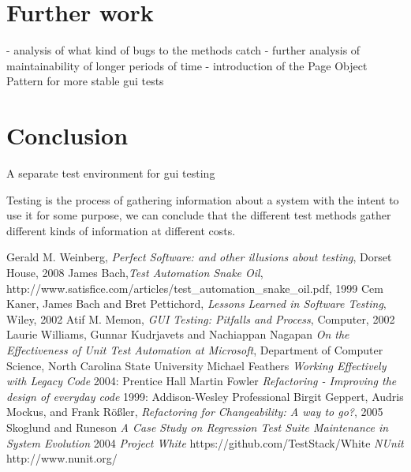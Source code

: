 \documentclass{article}
\begin{document}
	\section{Further work}
	- analysis of what kind of bugs to the methods catch
	- further analysis of maintainability of longer periods of time 
	- introduction of the Page Object Pattern for more stable gui tests

	\section{Conclusion}
		A separate test environment for gui testing

		Testing is the process of gathering information about a system with the intent to use it for some purpose, we can conclude that the different test methods gather different kinds of information at different costs.

\begin{thebibliography}{1}
 Gerald M. Weinberg, {\em Perfect Software: and other illusions about testing}, Dorset House, 2008
 James Bach,{\em Test Automation Snake Oil}, http://www.satisfice.com/articles/test\_automation\_snake\_oil.pdf, 1999 
 Cem Kaner, James Bach and Bret Pettichord, {\em Lessons Learned in Software Testing}, Wiley, 2002
 Atif M. Memon, {\em GUI Testing: Pitfalls and Process}, Computer, 2002
 Laurie Williams, Gunnar Kudrjavets and Nachiappan Nagapan {\em On the Effectiveness of Unit Test Automation at Microsoft}, Department of Computer Science, North Carolina State University
 Michael Feathers {\em Working Effectively with Legacy Code} 2004: Prentice Hall
 Martin Fowler {\em Refactoring - Improving the design of everyday code} 1999: Addison-Wesley Professional
 Birgit Geppert, Audris Mockus, and Frank Rößler, {\em Refactoring for Changeability: A way to go?}, 2005
 Skoglund and Runeson {\em A Case Study on Regression Test Suite Maintenance in System Evolution} 2004 
 {\em Project White} https://github.com/TestStack/White
 {\em NUnit} http://www.nunit.org/
\end{thebibliography}
\end{document}

